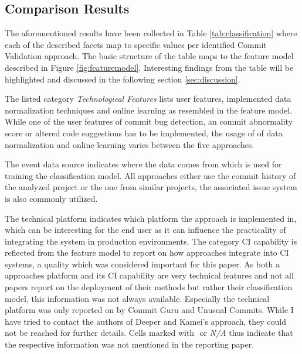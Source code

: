 
\subsection{Comparison Results}

The aforementioned results have been collected in Table \ref{tab:classification} where each of the described facets map to specific values per identified Commit Validation approach. The basic structure of the table maps to the feature model described in Figure \ref{fig:featuremodel}. 
Interesting findings from the table will be highlighted and discussed in the following section \ref{sec:discussion}.

The listed category \textit{Technological Features} lists user features, implemented data normalization techniques and online learning as resembled in the feature model. While one of the user features of commit bug detection, an commit abnormality score or altered code suggestions has to be implemented, the usage of of data normalization and online learning varies between the five approaches.

The event data source indicates where the data comes from which is used for training the classification model. All approaches either use the commit history of the analyzed project or the one from similar projects, the associated issue system is also commonly utilized.

\newcommand{\pointyes}{\CIRCLE}
\newcommand{\pnotapplicable}{\LEFTcircle}
\newcommand{\pointno}{\Circle}

The technical platform indicates which platform the approach is implemented in, which can be interesting for the end user as it can influence the practicality of integrating the system in production environments. The category CI capability is reflected from the feature model to report on how approaches integrate into CI systems, a quality which was considered important for this paper. As both a approaches platform and its CI capability are very technical features and not all papers report on the deployment of their methods but rather their classification model, this information was not always available. Especially the technical platform was only reported on by Commit Guru and Unusual Commits. While I have tried to contact the authors of Deeper and Kamei's approach, they could not be reached for further details. Cells marked with \pnotapplicable $ $ or \textit{N/A} thus indicate that the respective information was not mentioned in the reporting paper.

